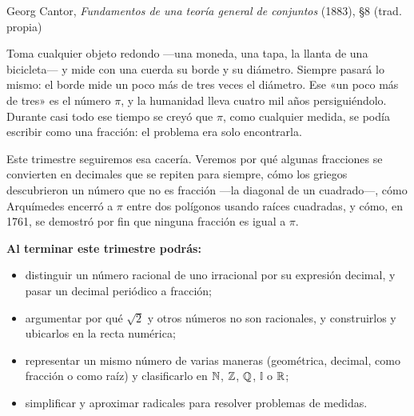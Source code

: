 \documentclass[11pt]{article}
\newcommand{\I}{\mathbb{I}}
\begin{document}
\encabezado

{Georg Cantor, \emph{Fundamentos de una teoría general de conjuntos} (1883), §8 (trad. propia)}


Toma cualquier objeto redondo —una moneda, una tapa, la llanta de una
bicicleta— y mide con una cuerda su borde y su diámetro. Siempre pasará lo
mismo: el borde mide un poco más de tres veces el diámetro. Ese «un poco más
de tres» es el número $\pi$, y la humanidad lleva cuatro mil años
persiguiéndolo. Durante casi todo ese tiempo se creyó que $\pi$, como
cualquier medida, se podía escribir como una fracción: el problema era solo
encontrarla.

Este trimestre seguiremos esa cacería. Veremos por qué algunas fracciones se
convierten en decimales que se repiten para siempre, cómo los griegos
descubrieron un número que no es fracción —la diagonal de un cuadrado—, cómo
Arquímedes encerró a $\pi$ entre dos polígonos usando raíces cuadradas, y
cómo, en 1761, se demostró por fin que ninguna fracción es igual a $\pi$.

\textbf{Al terminar este trimestre podrás:}
\begin{itemize}
  \item distinguir un número racional de uno irracional por su expresión
        decimal, y pasar un decimal periódico a fracción;
  \item argumentar por qué $\sqrt{2}$ y otros números no son racionales, y
        construirlos y ubicarlos en la recta numérica;
  \item representar un mismo número de varias maneras (geométrica, decimal,
        como fracción o como raíz) y clasificarlo en $\mathbb{N}$, $\mathbb{Z}$, $\mathbb{Q}$, $\I$ o $\mathbb{R}$;
  \item simplificar y aproximar radicales para resolver problemas de medidas.
\end{itemize}
\end{document}
